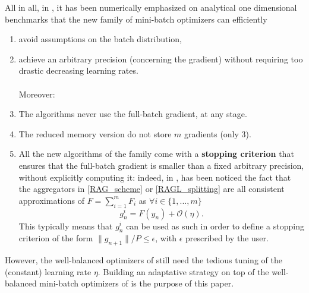 All in all, in \cite{partI}, it has been numerically emphasized on analytical one dimensional benchmarks that the new family of mini-batch optimizers can efficiently
\begin{enumerate}
	\item {avoid assumptions on the batch distribution}, 
	\item achieve an arbitrary precision (concerning the gradient) without requiring too drastic decreasing learning rates. \\ \ \\
          Moreover: \\
	\item The algorithms never use the full-batch gradient, at any stage. 
        \item The reduced memory version do not store $m$ gradients (only $3$). 
	\item All the new algorithms of the family come with a \textbf{stopping criterion} that ensures that the full-batch gradient is smaller than a fixed arbitrary
          precision, without explicitly computing it: indeed, in \cite{partI}, has been noticed the fact that the aggregators in \eqref{RAG_scheme} or \eqref{RAGL_splitting} are all
          consistent approximations of $F=\sum_{i=1}^m F_i$ as 
$\forall i\in\{1,...,m\}$ 
  \begin{equation}
    \label{stopping_criterion}
    g_n^i = F(y_n) +\mathcal{O}(\eta). 
  \end{equation}
  This typically means that $g_n^i$ can be used as such in order to define a stopping criterion of the form $\|g_{n+1}\|/P \leq
  \epsilon$, with $\epsilon$ prescribed by the user. 
\end{enumerate}
However, the well-balanced optimizers of \cite{partI} still need the tedious tuning of the (constant) learning rate $\eta$. 
Building an adaptative strategy on top of the well-balanced mini-batch
          optimizers of \cite{partI} is the purpose of this paper. 

